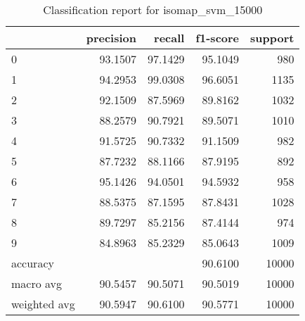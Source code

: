 \begin{table}[htb!]
\centering
\begin{tabular}{lrrrr}
    \toprule
 & precision & recall & f1-score & support \\
\midrule
0 & 93.1507 & 97.1429 & 95.1049 & 980 \\
1 & 94.2953 & 99.0308 & 96.6051 & 1135 \\
2 & 92.1509 & 87.5969 & 89.8162 & 1032 \\
3 & 88.2579 & 90.7921 & 89.5071 & 1010 \\
4 & 91.5725 & 90.7332 & 91.1509 & 982 \\
5 & 87.7232 & 88.1166 & 87.9195 & 892 \\
6 & 95.1426 & 94.0501 & 94.5932 & 958 \\
7 & 88.5375 & 87.1595 & 87.8431 & 1028 \\
8 & 89.7297 & 85.2156 & 87.4144 & 974 \\
9 & 84.8963 & 85.2329 & 85.0643 & 1009 \\
accuracy & & & 90.6100 & 10000\\
macro avg & 90.5457 & 90.5071 & 90.5019 & 10000 \\
weighted avg & 90.5947 & 90.6100 & 90.5771 & 10000 \\
\bottomrule
\end{tabular}
\caption{Classification report for isomap\_svm\_15000}
\label{tab:classification-report-isomap_svm_15000}
\end{table}
